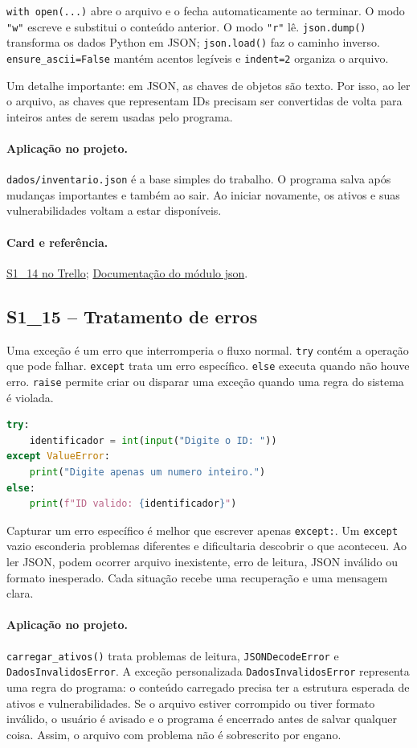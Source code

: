 \documentclass[11pt,a4paper]{article}
\newcommand{\projeto}{\paragraph{Aplicação no projeto.}}
\newcommand{\referencia}[2]{\paragraph{Card e referência.}\href{#1}{#2}}
\newcommand{\cardsection}[1]{\Needspace{12\baselineskip}\subsection{#1}}
\begin{document}
\texttt{with open(...)} abre o arquivo e o fecha automaticamente ao terminar. O modo \texttt{"w"} escreve e substitui o conteúdo anterior. O modo \texttt{"r"} lê. \texttt{json.dump()} transforma os dados Python em JSON; \texttt{json.load()} faz o caminho inverso. \texttt{ensure\_ascii=False} mantém acentos legíveis e \texttt{indent=2} organiza o arquivo.

Um detalhe importante: em JSON, as chaves de objetos são texto. Por isso, ao ler o arquivo, as chaves que representam IDs precisam ser convertidas de volta para inteiros antes de serem usadas pelo programa.

\projeto
\texttt{dados/inventario.json} é a base simples do trabalho. O programa salva após mudanças importantes e também ao sair. Ao iniciar novamente, os ativos e suas vulnerabilidades voltam a estar disponíveis.

\referencia{https://trello.com/c/xdRh1TRi}{S1\_14 no Trello}; \href{https://docs.python.org/3/library/json.html}{Documentação do módulo json}.

\cardsection{S1\_15 -- Tratamento de erros}

Uma exceção é um erro que interromperia o fluxo normal. \texttt{try} contém a operação que pode falhar. \texttt{except} trata um erro específico. \texttt{else} executa quando não houve erro. \texttt{raise} permite criar ou disparar uma exceção quando uma regra do sistema é violada.

\begin{lstlisting}[language=Python,caption={Tratamento de erro de conversão}]
try:
    identificador = int(input("Digite o ID: "))
except ValueError:
    print("Digite apenas um numero inteiro.")
else:
    print(f"ID valido: {identificador}")
\end{lstlisting}

Capturar um erro específico é melhor que escrever apenas \texttt{except:}. Um \texttt{except} vazio esconderia problemas diferentes e dificultaria descobrir o que aconteceu. Ao ler JSON, podem ocorrer arquivo inexistente, erro de leitura, JSON inválido ou formato inesperado. Cada situação recebe uma recuperação e uma mensagem clara.

\projeto
\texttt{carregar\_ativos()} trata problemas de leitura, \texttt{JSONDecodeError} e \texttt{DadosInvalidosError}. A exceção personalizada \texttt{DadosInvalidosError} representa uma regra do programa: o conteúdo carregado precisa ter a estrutura esperada de ativos e vulnerabilidades. Se o arquivo estiver corrompido ou tiver formato inválido, o usuário é avisado e o programa é encerrado antes de salvar qualquer coisa. Assim, o arquivo com problema não é sobrescrito por engano.
\end{document}
